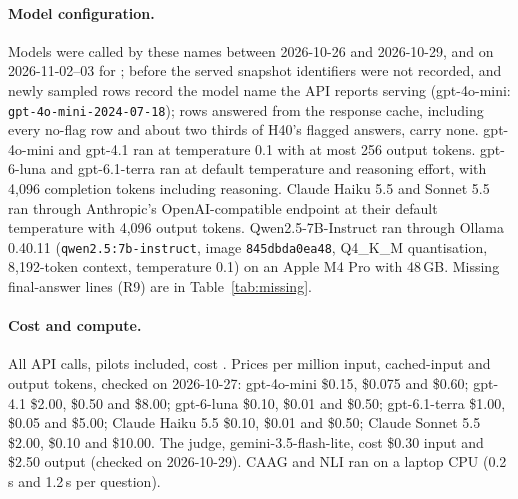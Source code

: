 \paragraph{Model configuration.} Models were called by these names between 2026-10-26 and 2026-10-29, and on
2026-11-02--03 for ; before  the served snapshot identifiers were not recorded, and newly sampled 
rows record the model name the API reports serving (gpt-4o-mini: \texttt{gpt-4o-mini-2024-07-18}); rows answered from
the response cache, including every no-flag row and about two thirds of H40's flagged answers, carry none. gpt-4o-mini and gpt-4.1 ran at temperature 0.1
with at most 256 output tokens. gpt-6-luna and gpt-6.1-terra ran at default temperature and
reasoning effort, with 4,096 completion tokens including reasoning. Claude Haiku 5.5 and Sonnet 5.5 ran through
Anthropic's OpenAI-compatible endpoint at their default temperature with 4,096 output tokens. Qwen2.5-7B-Instruct ran
through Ollama 0.40.11 (\texttt{qwen2.5:7b-instruct}, image \texttt{845dbda0ea48}, Q4\_K\_M quantisation, 8,192-token
context, temperature 0.1) on an Apple M4 Pro with 48\,GB. Missing final-answer lines (R9) are in
Table~\ref{tab:missing}.

\paragraph{Cost and compute.} All API calls, pilots included, cost \totalSpend. Prices per million input, cached-input and output tokens, checked on 2026-10-27: gpt-4o-mini \$0.15, \$0.075 and \$0.60; gpt-4.1 \$2.00, \$0.50 and \$8.00; gpt-6-luna \$0.10, \$0.01 and \$0.50; gpt-6.1-terra \$1.00, \$0.05 and \$5.00; Claude Haiku 5.5 \$0.10, \$0.01 and
\$0.50; Claude Sonnet 5.5 \$2.00, \$0.10 and \$10.00. The  judge, gemini-3.5-flash-lite, cost \$0.30 input and \$2.50 output (checked on 2026-10-29). CAAG and NLI ran on a
laptop CPU (0.2\,s and 1.2\,s per question).
